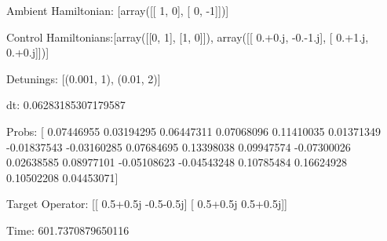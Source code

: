 \documentclass{article}
\begin{document}
    

\newpage

Ambient Hamiltonian: [array([[ 1,  0],
       [ 0, -1]])]

Control Hamiltonians:[array([[0, 1],
       [1, 0]]), array([[ 0.+0.j, -0.-1.j],
       [ 0.+1.j,  0.+0.j]])]

Detunings: [(0.001, 1), (0.01, 2)]

 dt: 0.06283185307179587

Probs: [ 0.07446955  0.03194295  0.06447311  0.07068096  0.11410035  0.01371349
 -0.01837543 -0.03160285  0.07684695  0.13398038  0.09947574 -0.07300026
  0.02638585  0.08977101 -0.05108623 -0.04543248  0.10785484  0.16624928
  0.10502208  0.04453071]

Target Operator: [[ 0.5+0.5j -0.5-0.5j]
 [ 0.5+0.5j  0.5+0.5j]]

Time: 601.7370879650116
\end{document}
